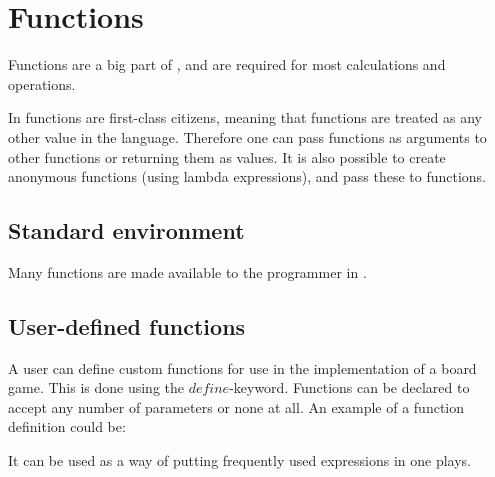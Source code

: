 \section{Functions}
\label{sec:functions}

Functions are a big part of \productname, and are required for most calculations and operations.

In \productname functions are first-class citizens, meaning that functions are treated
as any other value in the language. Therefore one can pass functions as
arguments to other functions or returning them as values. It is also possible to create
anonymous functions (using lambda expressions), and pass these to functions.

\subsection{Standard environment}

Many functions are made available to the programmer in \productname.

\subsection{User-defined functions}

A user can define custom functions for use in the implementation of a board game.
This is done using the $define$-keyword. Functions can be declared to accept
any number of parameters or none at all. An example of a function definition could
be:


It can be used as a way of putting frequently used expressions in one plays. 
